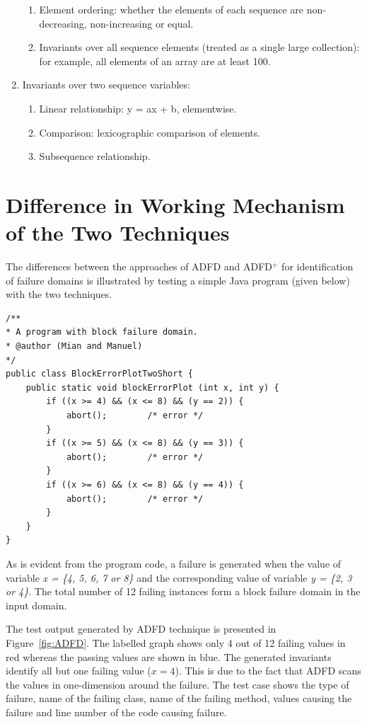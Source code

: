 \begin{enumerate}
\begin{enumerate}
	\item Element ordering: whether the elements of each sequence are non-decreasing, non-increasing or equal.
	\item Invariants over all sequence elements (treated as a single large collection): for example, all elements of an array are at least 100.
	\end{enumerate}
\item Invariants over two sequence variables: 
	\begin{enumerate}
	\item Linear relationship: y = ax + b, elementwise. 
	\item Comparison: lexicographic comparison of elements. 
	\item Subsequence relationship.
	\end{enumerate}
\end{enumerate}








\section{Difference in Working Mechanism of the Two Techniques}
The differences between the approaches of ADFD and ADFD$^+$ for identification of failure domains is illustrated by testing a simple Java program (given below) with the two techniques. 
\bigskip
\begin{lstlisting}
/** 
* A program with block failure domain.
* @author (Mian and Manuel)
*/
public class BlockErrorPlotTwoShort {
	public static void blockErrorPlot (int x, int y) {
		if ((x >= 4) && (x <= 8) && (y == 2)) { 
			abort();		/* error */
		}
		if ((x >= 5) && (x <= 8) && (y == 3)) { 
			abort();		/* error */
		}
		if ((x >= 6) && (x <= 8) && (y == 4)) { 
			abort();		/* error */
		}
	}
}
\end{lstlisting}
\bigskip


As is evident from the program code, a failure is generated when the value of variable \textit{x = \{4, 5, 6, 7 or 8\}} and the corresponding value of variable \textit{y = \{2, 3 or 4\}}. The total number of 12 failing instances form a block failure domain in the input domain.

The test output generated by ADFD technique is presented in Figure~\ref{fig:ADFD}. The labelled graph shows only 4 out of 12 failing values in red whereas the passing values are shown in blue. The generated invariants identify all but one failing value ($x = 4$). This is due to the fact that ADFD scans the values in one-dimension around the failure. The test case shows the type of failure, name of the failing class, name of the failing method, values causing the failure and line number of the code causing failure.

